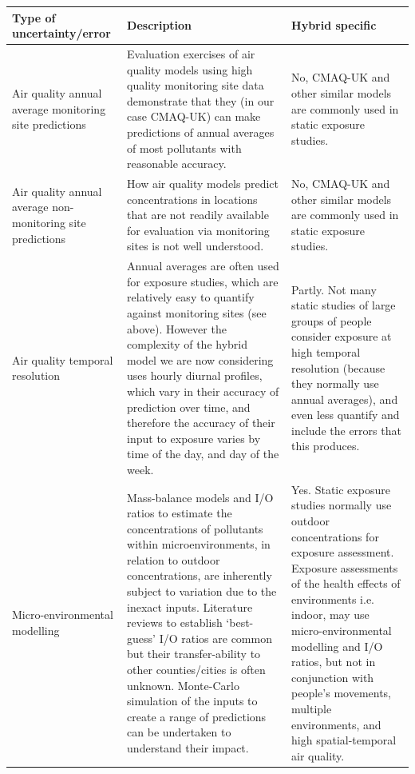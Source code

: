 \thispagestyle{empty}
\begin{landscape}

\begin{table}[]
\centering
\begin{tabular}{ | p{3cm} | p{13.2cm} | p{7.7cm} |}
\hline
\textbf{Type of uncertainty/error} & \textbf{Description} & \textbf{Hybrid specific} \\ \hline
        Air quality annual average monitoring site predictions  &  Evaluation exercises of air quality models using high quality monitoring site data demonstrate that they (in our case CMAQ-UK) can make predictions of annual averages of most pollutants with reasonable accuracy.         &  No, CMAQ-UK and other similar models are commonly used in static exposure studies.         \\ \hline
        
        Air quality annual average non-monitoring site predictions  &  How air quality models predict concentrations in locations that are not readily available for evaluation via monitoring sites is not well understood.         &   No, CMAQ-UK and other similar models are commonly used in static exposure studies.        \\ \hline
        
        Air quality temporal resolution  &  Annual averages are often used for exposure studies, which are relatively easy to quantify against monitoring sites (see above). However the complexity of the hybrid model we are now considering uses hourly diurnal profiles, which vary in their accuracy of prediction over time, and therefore the accuracy of their input to exposure varies by time of the day, and day of the week.         &   Partly. Not many static studies of large groups of people consider exposure at high temporal resolution (because they normally use annual averages), and even less quantify and include the errors that this produces.        \\ \hline
        
        Micro-environmental modelling  &   Mass-balance models and I/O ratios to estimate the concentrations of pollutants within microenvironments, in relation to outdoor concentrations, are inherently subject to variation due to the inexact inputs. Literature reviews to establish ‘best-guess’ I/O ratios are common but their transfer-ability to other counties/cities is often unknown. Monte-Carlo simulation of the inputs to create a range of predictions can be undertaken to understand their impact.         &    Yes. Static exposure studies normally use outdoor concentrations for exposure assessment. Exposure assessments of the health effects of environments i.e. indoor, may use micro-environmental modelling and I/O ratios, but not in conjunction with people’s movements, multiple environments, and high spatial-temporal air quality.       \\ \hline
        

\end{tabular}
\end{table}
\end{landscape}

